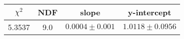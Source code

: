 \begin{tabular}{|c|c|c|c|}

\hline
$\chi^{2}$ & NDF & slope & y-intercept  \\
\hline
5.3537 & 9.0 & $0.0004\pm0.001$ & $1.0118\pm0.0956$ \\
\hline

\end{tabular}
